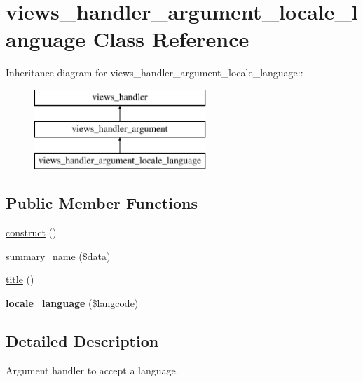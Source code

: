 \hypertarget{classviews__handler__argument__locale__language}{
\section{views\_\-handler\_\-argument\_\-locale\_\-language Class Reference}
\label{classviews__handler__argument__locale__language}
}
Inheritance diagram for views\_\-handler\_\-argument\_\-locale\_\-language::\begin{figure}[H]
\begin{center}
\leavevmode
\includegraphics[height=3cm]{classviews__handler__argument__locale__language}
\end{center}
\end{figure}
\subsection*{Public Member Functions}
\begin{DoxyCompactItemize}
\item 
\hyperlink{classviews__handler__argument__locale__language_ade5af4ea7ada57c6716a6712bbc767c5}{construct} ()
\item 
\hyperlink{classviews__handler__argument__locale__language_a1677e5e59d9e98999bf5781d7de21b39}{summary\_\-name} (\$data)
\item 
\hyperlink{classviews__handler__argument__locale__language_a87bfadf6710bcc6bee4f734d258e7407}{title} ()
\item 
\hypertarget{classviews__handler__argument__locale__language_af69fb99da31a079b833d8d2b24a75fd2}{
{\bfseries locale\_\-language} (\$langcode)}
\label{classviews__handler__argument__locale__language_af69fb99da31a079b833d8d2b24a75fd2}

\end{DoxyCompactItemize}


\subsection{Detailed Description}
Argument handler to accept a language. 

